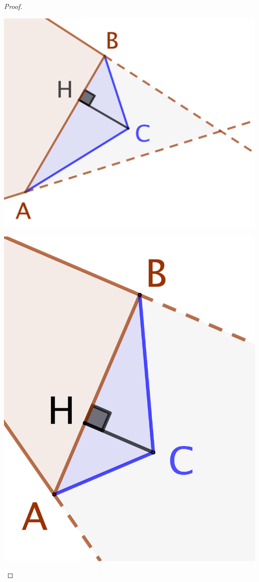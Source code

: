 \begin{proof}
\begin{enumerate}
\begin{multicols}{2}
			\includegraphics[scale=.4]{content/polygon/at-least-one/add-vertex-1.png}

			\includegraphics[scale=.4]{content/polygon/at-least-one/add-vertex-2.png}
		\end{multicols}


\end{enumerate}
\end{proof}
